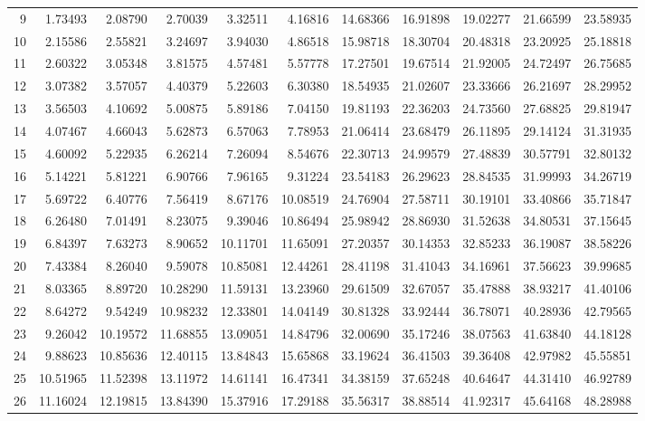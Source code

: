 {{\begin{sideways}
\begin{minipage}[t]{\textwidth}
\begin{small}
{\begin{tabular}{|r|rrrrr||rrrrr|}
  9&  1.73493&  2.08790&  2.70039&  3.32511&  4.16816& 14.68366& 16.91898& 19.02277& 21.66599& 23.58935\\
 10&  2.15586&  2.55821&  3.24697&  3.94030&  4.86518& 15.98718& 18.30704& 20.48318& 23.20925& 25.18818\\
 11&  2.60322&  3.05348&  3.81575&  4.57481&  5.57778& 17.27501& 19.67514& 21.92005& 24.72497& 26.75685\\
 12&  3.07382&  3.57057&  4.40379&  5.22603&  6.30380& 18.54935& 21.02607& 23.33666& 26.21697& 28.29952\\
 13&  3.56503&  4.10692&  5.00875&  5.89186&  7.04150& 19.81193& 22.36203& 24.73560& 27.68825& 29.81947\\
 14&  4.07467&  4.66043&  5.62873&  6.57063&  7.78953& 21.06414& 23.68479& 26.11895& 29.14124& 31.31935\\
 15&  4.60092&  5.22935&  6.26214&  7.26094&  8.54676& 22.30713& 24.99579& 27.48839& 30.57791& 32.80132\\
 16&  5.14221&  5.81221&  6.90766&  7.96165&  9.31224& 23.54183& 26.29623& 28.84535& 31.99993& 34.26719\\
 17&  5.69722&  6.40776&  7.56419&  8.67176& 10.08519& 24.76904& 27.58711& 30.19101& 33.40866& 35.71847\\
 18&  6.26480&  7.01491&  8.23075&  9.39046& 10.86494& 25.98942& 28.86930& 31.52638& 34.80531& 37.15645\\
 19&  6.84397&  7.63273&  8.90652& 10.11701& 11.65091& 27.20357& 30.14353& 32.85233& 36.19087& 38.58226\\
 20&  7.43384&  8.26040&  9.59078& 10.85081& 12.44261& 28.41198& 31.41043& 34.16961& 37.56623& 39.99685\\
 21&  8.03365&  8.89720& 10.28290& 11.59131& 13.23960& 29.61509& 32.67057& 35.47888& 38.93217& 41.40106\\
 22&  8.64272&  9.54249& 10.98232& 12.33801& 14.04149& 30.81328& 33.92444& 36.78071& 40.28936& 42.79565\\
 23&  9.26042& 10.19572& 11.68855& 13.09051& 14.84796& 32.00690& 35.17246& 38.07563& 41.63840& 44.18128\\
 24&  9.88623& 10.85636& 12.40115& 13.84843& 15.65868& 33.19624& 36.41503& 39.36408& 42.97982& 45.55851\\
 25& 10.51965& 11.52398& 13.11972& 14.61141& 16.47341& 34.38159& 37.65248& 40.64647& 44.31410& 46.92789\\
 26& 11.16024& 12.19815& 13.84390& 15.37916& 17.29188& 35.56317& 38.88514& 41.92317& 45.64168& 48.28988\\

\end{tabular}}
\end{small}
\end{minipage}
\end{sideways}}}
